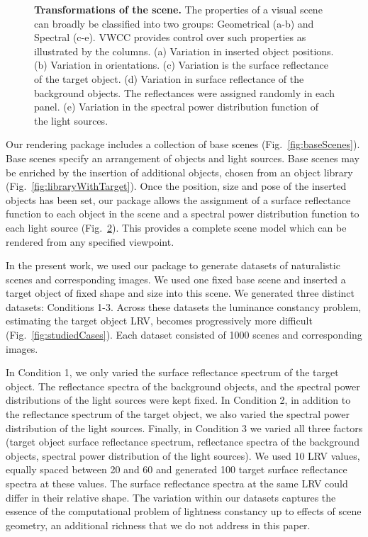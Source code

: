 \documentclass{jov}
\begin{document}
\begin{figure}
\begin{subfigure}[b]{0.18 \textwidth}
        \label{fig:illuminationVariation}
    \end{subfigure}
    \caption{{\bf Transformations of the scene.} The properties of a visual scene can broadly be classified into two groups: Geometrical (a-b) and Spectral (c-e). VWCC provides control over such properties as illustrated by the columns. (a) Variation in inserted object positions. (b) Variation in orientations. (c) Variation is the surface reflectance of the target object. (d) Variation in surface reflectance of the background objects. The reflectances were assigned randomly in each panel. (e) Variation in the spectral power distribution function of the light sources. 
\label{fig:VWCCTransformations}}
\end{figure}

Our rendering package includes a collection of base scenes (Fig.~\ref{fig:baseScenes}).
Base scenes specify an arrangement of objects and light sources.
Base scenes may be enriched by the insertion of additional objects, chosen from an object library (Fig.~\ref{fig:libraryWithTarget}).
Once the position, size and pose of the inserted objects has been set, 
our package allows the assignment of a surface reflectance function to each object in the scene 
and a spectral power distribution function to each light source (Fig.~\ref{fig:VWCCTransformations}).
This provides a complete scene model which can be rendered from any specified viewpoint.

In the present work, we used our package to generate datasets of naturalistic scenes and corresponding images.
We used one fixed base scene and inserted a target object of fixed shape and size into this scene.
We generated three distinct datasets: Conditions 1-3.
Across these datasets the luminance constancy problem, estimating the target object LRV,
becomes progressively more difficult (Fig.~\ref{fig:studiedCases}).
Each dataset consisted of 1000 scenes and corresponding images.

In Condition 1, we only varied the surface reflectance spectrum of the target object.
The reflectance spectra of the background objects, and the spectral power distributions of the light sources were kept fixed.
In Condition 2, in addition to the reflectance spectrum of the target object,
we also varied the spectral power distribution of the light sources.
Finally, in Condition 3 we varied all three factors (target object surface 
reflectance spectrum, reflectance spectra of the background objects, 
spectral power distribution of the light sources).
We used 10 LRV values, equally spaced between 20 and 60 and generated 100 target surface reflectance spectra at these values. 
The surface reflectance spectra at the same LRV could differ in their relative shape.
The variation within our datasets captures the essence of the computational problem of lightness constancy
up to effects of scene geometry, an additional richness that we do not address in this paper.
\end{document}
